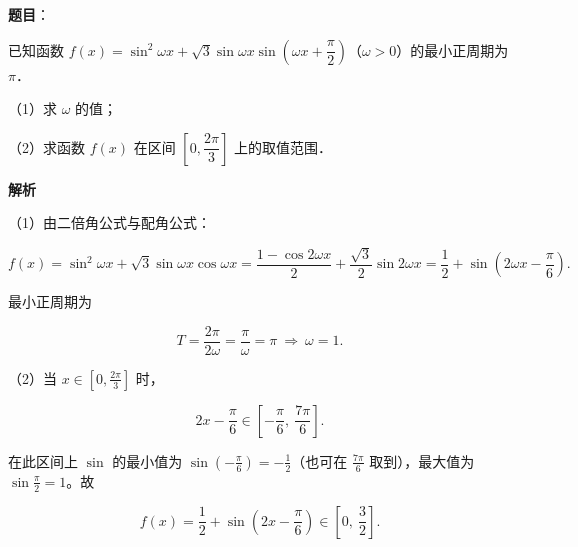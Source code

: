 \begin{answer}

\textbf{题目}：

已知函数 $f(x)=\sin^2\omega x+\sqrt3\sin\omega x\sin\left(\omega x+\dfrac{\pi}{2}\right)$（$\omega>0$）的最小正周期为 $\pi$．

（1）求 $\omega$ 的值；

（2）求函数 $f(x)$ 在区间 $\left[0,\dfrac{2\pi}{3}\right]$ 上的取值范围．

\textbf{解析}

（1）由二倍角公式与配角公式：

\nopagebreak[4]
\[f(x)=\sin^2\omega x+\sqrt3\sin\omega x\cos\omega x
=\frac{1-\cos2\omega x}{2}+\frac{\sqrt3}{2}\sin2\omega x
=\frac12+\sin\left(2\omega x-\frac\pi6\right).\]

最小正周期为

\nopagebreak[4]
\[T=\frac{2\pi}{2\omega}=\frac\pi\omega=\pi\ \Longrightarrow\ \omega=1 .\]

（2）当 $x\in\left[0,\frac{2\pi}{3}\right]$ 时，

\nopagebreak[4]
\[2x-\frac\pi6\in\left[-\frac\pi6,\ \frac{7\pi}{6}\right].\]

在此区间上 $\sin$ 的最小值为 $\sin\left(-\frac\pi6\right)=-\frac12$（也可在 $\frac{7\pi}{6}$ 取到），最大值为 $\sin\frac\pi2=1$。故

\nopagebreak[4]
\[f(x)=\frac12+\sin\left(2x-\frac\pi6\right)\in\left[0,\ \frac32\right].\]


\end{answer}
